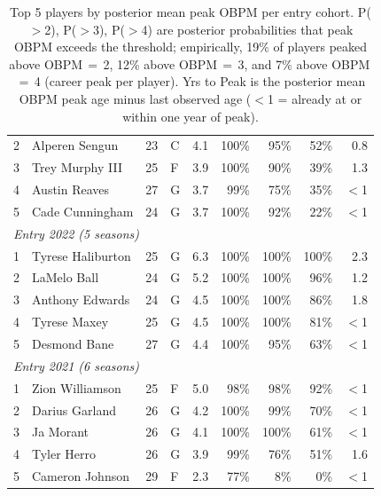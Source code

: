 \begin{table}[htbp]
\begin{tabular}{rlrlrrrrr}
    2 & Alperen Sengun & 23 & C & 4.1 & 100\% & 95\% & 52\% & 0.8 \\
    3 & Trey Murphy III & 25 & F & 3.9 & 100\% & 90\% & 39\% & 1.3 \\
    4 & Austin Reaves & 27 & G & 3.7 & 99\% & 75\% & 35\% & $<$1 \\
    5 & Cade Cunningham & 24 & G & 3.7 & 100\% & 92\% & 22\% & $<$1 \\
    \midrule[0.4pt]
    \multicolumn{9}{l}{\textit{Entry 2022 (5 seasons)}} \\
    \midrule
    1 & Tyrese Haliburton & 25 & G & 6.3 & 100\% & 100\% & 100\% & 2.3 \\
    2 & LaMelo Ball & 24 & G & 5.2 & 100\% & 100\% & 96\% & 1.2 \\
    3 & Anthony Edwards & 24 & G & 4.5 & 100\% & 100\% & 86\% & 1.8 \\
    4 & Tyrese Maxey & 25 & G & 4.5 & 100\% & 100\% & 81\% & $<$1 \\
    5 & Desmond Bane & 27 & G & 4.4 & 100\% & 95\% & 63\% & $<$1 \\
    \midrule[0.4pt]
    \multicolumn{9}{l}{\textit{Entry 2021 (6 seasons)}} \\
    \midrule
    1 & Zion Williamson & 25 & F & 5.0 & 98\% & 98\% & 92\% & $<$1 \\
    2 & Darius Garland & 26 & G & 4.2 & 100\% & 99\% & 70\% & $<$1 \\
    3 & Ja Morant & 26 & G & 4.1 & 100\% & 100\% & 61\% & $<$1 \\
    4 & Tyler Herro & 26 & G & 3.9 & 99\% & 76\% & 51\% & 1.6 \\
    5 & Cameron Johnson & 29 & F & 2.3 & 77\% & 8\% & 0\% & $<$1 \\
    \bottomrule
  \end{tabular}
  \caption{Top 5 players by posterior mean peak OBPM per entry cohort. P($>$2), P($>$3), P($>$4) are posterior probabilities that peak OBPM exceeds the threshold; empirically, 19\% of players peaked above OBPM\,$=$\,2, 12\% above OBPM\,$=$\,3, and 7\% above OBPM\,$=$\,4 (career peak per player). Yrs to Peak is the posterior mean OBPM peak age minus last observed age ($<$1 = already at or within one year of peak).}
  \label{tab:breakout_cohort}
\end{table}


